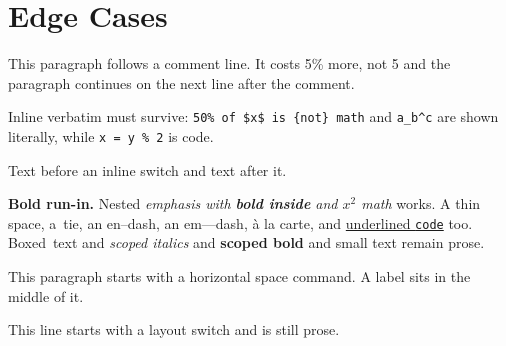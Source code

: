 \section{Edge Cases}
\label{sec:edge}
This paragraph follows a comment line. It costs 5\% more, not 5%
and the paragraph continues on the next line after the comment.

Inline verbatim must survive: \verb|50% of $x$ is {not} math| and \verb+a_b^c+ are shown literally, while \lstinline!x = y % 2! is code.

Text before an inline switch and text after it.

\noindent\textbf{Bold run-in.} Nested \emph{emphasis with \textbf{bold inside} and $x^2$ math} works. A thin\,space, a~tie, an en--dash, an em---dash, \`a la carte, and \underline{underlined \texttt{code}} too. \mbox{Boxed text} and {\itshape scoped italics} and {\bfseries scoped bold} and {\small small text} remain prose.

\hspace{1em}This paragraph starts with a horizontal space command. \label{para:anchor}A label sits in the middle of it.

\centering This line starts with a layout switch and is still prose.

